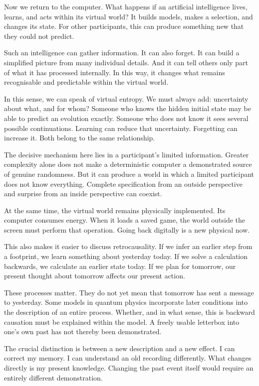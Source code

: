 Now we return to the computer. What happens if an artificial intelligence lives, learns, and acts within its virtual world? It builds models, makes a selection, and changes its state. For other participants, this can produce something new that they could not predict.

Such an intelligence can gather information. It can also forget. It can build a simplified picture from many individual details. And it can tell others only part of what it has processed internally. In this way, it changes what remains recognisable and predictable within the virtual world.

In this sense, we can speak of virtual entropy. We must always add: uncertainty about what, and for whom? Someone who knows the hidden initial state may be able to predict an evolution exactly. Someone who does not know it sees several possible continuations. Learning can reduce that uncertainty. Forgetting can increase it. Both belong to the same relationship.

The decisive mechanism here lies in a participant's limited information. Greater complexity alone does not make a deterministic computer a demonstrated source of genuine randomness. But it can produce a world in which a limited participant does not know everything. Complete specification from an outside perspective and surprise from an inside perspective can coexist.

At the same time, the virtual world remains physically implemented. Its computer consumes energy. When it loads a saved game, the world outside the screen must perform that operation. Going back digitally is a new physical now.

This also makes it easier to discuss retrocausality. If we infer an earlier step from a footprint, we learn something about yesterday today. If we solve a calculation backwards, we calculate an earlier state today. If we plan for tomorrow, our present thought about tomorrow affects our present action.

These processes matter. They do not yet mean that tomorrow has sent a message to yesterday. Some models in quantum physics incorporate later conditions into the description of an entire process. Whether, and in what sense, this is backward causation must be explained within the model. A freely usable letterbox into one's own past has not thereby been demonstrated.

The crucial distinction is between a new description and a new effect. I can correct my memory. I can understand an old recording differently. What changes directly is my present knowledge. Changing the past event itself would require an entirely different demonstration.

